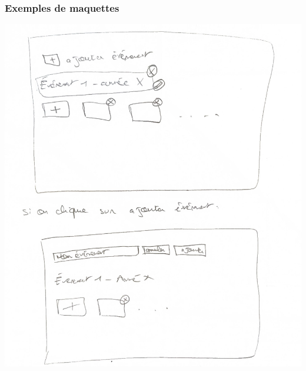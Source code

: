 \begin{frame}
    \frametitle{Exemples de maquettes}

    \begin{minipage}{0.48\textwidth}
        \centering
        \includegraphics[width=\linewidth]{pictures/maquette.png}
    \end{minipage}
    \hfill
    \begin{minipage}{0.48\textwidth}
        \centering

\end{minipage}
\end{frame}
